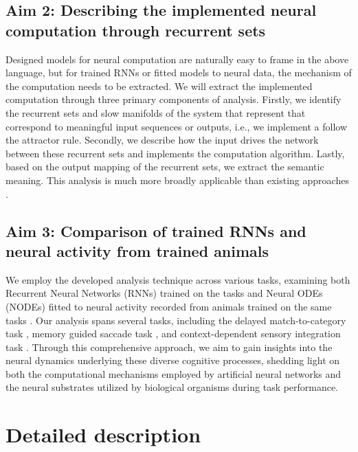\documentclass[12pt,letterpaper, onecolumn]{article}
\theoremstyle{definition}
\theoremstyle{remark}
\begin{document}
\subsection*{Aim 2: Describing the implemented neural computation through recurrent sets}
Designed models for neural computation are naturally easy to frame in the above language, but for trained RNNs or fitted models to neural data, the mechanism of the computation needs to be extracted. We will extract the implemented computation through three primary components of analysis. Firstly, we identify the recurrent sets and slow manifolds of the system that represent that correspond to meaningful input sequences or outputs, i.e., we implement a follow the attractor rule. Secondly, we describe how the input drives the network between these recurrent sets and implements the computation algorithm. Lastly, based on the output mapping of the recurrent sets, we extract the semantic meaning.
This analysis is much more broadly applicable than existing approaches \citep{sussillo2013blackbox, sussillo2014, beer2018, maheswaranathan2019universality, driscoll2022, mante2013context, turner2021charting, turner2023, casey1996, valente2022extracting}.

\subsection*{Aim 3: Comparison of trained RNNs and neural activity from trained animals}
We employ the developed analysis technique across various tasks, examining both Recurrent Neural Networks (RNNs) trained on the tasks and Neural ODEs (NODEs) fitted to neural activity recorded from animals trained on the same tasks \citep{zhao2016, pandarinath2018inferring, kim2021inferring}.
 Our analysis spans several tasks, including the delayed match-to-category task \citep{chaisangmongkon2017computing},
 memory guided saccade task \citep{wimmer2014},
  and context-dependent sensory integration task \citep{mante2013context}.
   Through this comprehensive approach, we aim to gain insights into the neural dynamics underlying these diverse cognitive processes, shedding light on both the computational mechanisms employed by artificial neural networks and the neural substrates utilized by biological organisms during task performance.



\newpage
\section{Detailed description}
\end{document}
